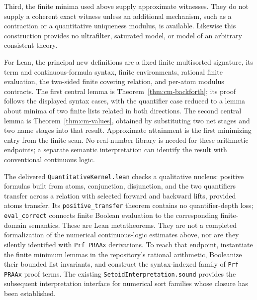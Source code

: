Third, the finite minima used above supply approximate witnesses.  They do not
supply a coherent exact witness unless an additional mechanism, such as a
contraction or a quantitative uniqueness modulus, is available.  Likewise
this construction provides no ultrafilter, saturated model, or model of an
arbitrary consistent theory.

For Lean, the principal new definitions are a fixed finite multisorted
signature, its term and continuous-formula syntax, finite environments,
rational finite evaluation, the two-sided finite covering relation, and
per-atom modulus contracts.  The first central lemma is
Theorem~\ref{thm:cm-backforth}; its proof follows the displayed syntax cases,
with the quantifier case reduced to a lemma about minima of two finite lists
related in both directions.  The second central lemma is
Theorem~\ref{thm:cm-values}, obtained by substituting two net stages and two
name stages into that result.  Approximate attainment is the first minimizing
entry from the finite scan.  No real-number library is needed for these
arithmetic endpoints; a separate semantic interpretation can identify the
result with conventional continuous logic.

The delivered \texttt{QuantitativeKernel.lean} checks a qualitative nucleus:
positive formulas built from atoms, conjunction, disjunction, and the two
quantifiers transfer across a relation with selected forward and backward
lifts, provided atoms transfer.  Its \texttt{positive\_transfer} theorem
contains no quantifier-depth loss; \texttt{eval\_correct} connects finite
Boolean evaluation to the corresponding finite-domain semantics.  These are
Lean metatheorems.  They are not a completed formalization of the numerical
continuous-logic estimates above, nor are they silently identified with
\texttt{Prf PRAAx} derivations.  To reach that endpoint, instantiate the finite
minimum lemmas in the repository's rational arithmetic, Booleanize their
bounded list invariants, and construct the syntax-indexed family of
\texttt{Prf PRAAx} proof terms.  The existing
\texttt{SetoidInterpretation.sound} provides the subsequent interpretation
interface for numerical sort families whose closure has been established.
